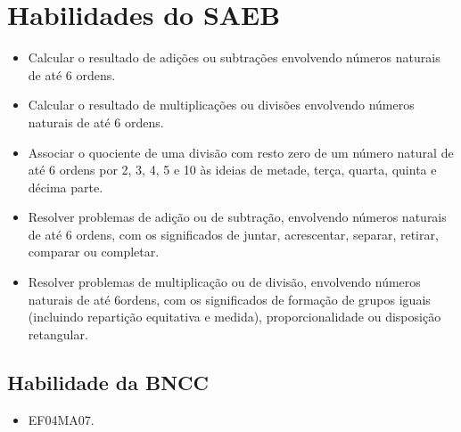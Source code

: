 \section{Habilidades do SAEB}

\begin{itemize}
\item Calcular o resultado de adições ou subtrações envolvendo números
naturais de até 6 ordens.
\item Calcular o resultado de multiplicações ou divisões envolvendo números
naturais de até 6 ordens.
\item Associar o quociente de uma divisão com resto zero de um número
natural de até 6 ordens por 2, 3, 4, 5 e 10 às ideias de metade, terça,
quarta, quinta e décima parte.
\item Resolver problemas de adição ou de subtração, envolvendo números
naturais de até 6 ordens, com os significados de juntar, acrescentar,
separar, retirar, comparar ou completar.
\item Resolver problemas de multiplicação ou de divisão, envolvendo números
naturais de até 6ordens, com os significados de formação de grupos
iguais (incluindo repartição equitativa e medida), proporcionalidade ou
disposição retangular.
\end{itemize}

\subsection{Habilidade da BNCC}

\begin{itemize}
\item EF04MA07.
\end{itemize}


